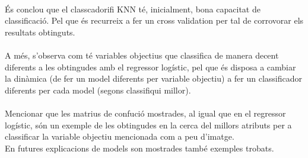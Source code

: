 \documentclass[a4paper, 11pt]{article}
\begin{document}
\\
És conclou que el classcadorifi KNN té, inicialment, bona capacitat de classificació. Pel que és recurreix a fer un cross validation per tal de corrovorar els resultats obtinguts.\\\\
A més, s'observa com té variables objectius que classifica de manera decent diferents a les obtingudes amb el regressor logístic, pel que és disposa a cambiar la dinàmica (de fer un model diferents per variable objectiu) a fer un classificador diferents per cada model (segons classifiqui millor).\\\\
Mencionar que les matrius de confució mostrades, al igual que en el regressor logístic, són un exemple de les obtingudes en la cerca del millors atributs per a classificar la variable objectiu mencionada com a peu d'imatge.\\
En futures explicacions de models son mostrades també exemples trobats.
\newpage 
\end{document}
